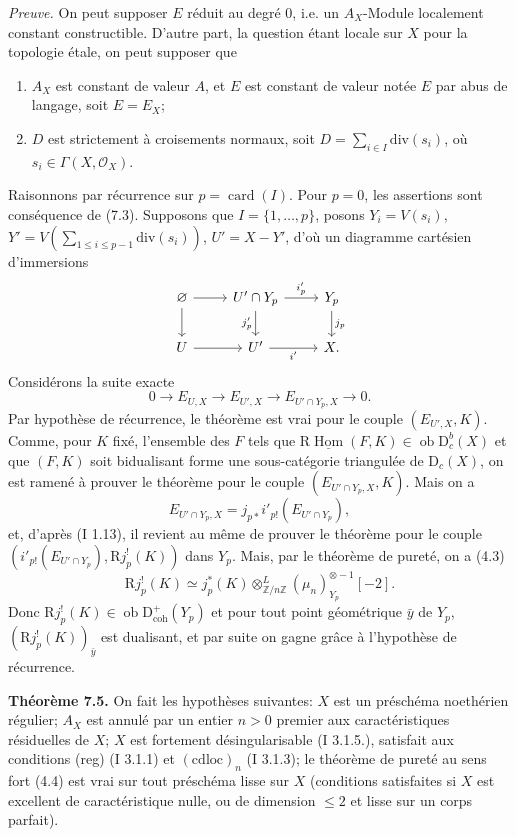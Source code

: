 \documentclass[11pt]{article}
\DeclareMathOperator{\Hom}{Hom}
\newcommand{\R}{\mathrm{R}}\newcommand{\RHomCore}{\mathrm{RHom}}
\newcommand{\D}{\mathrm{D}}
\newcommand{\Z}{\mathbb{Z}}
\newcommand{\ob}{\operatorname{ob}}
\providecommand{\Hom}{\operatorname{Hom}}
\providecommand{\ob}{\operatorname{ob}}
\providecommand{\R}{\mathrm R}
\providecommand{\Z}{\mathbb Z}
\providecommand{\Hom}{\operatorname{Hom}}
\begin{document}
\emph{Preuve.} On peut supposer $E$ réduit au degré $0$, i.e. un $A_X$-Module localement constant constructible. D'autre part, la question étant locale sur $X$ pour la topologie étale, on peut supposer que
\begin{enumerate}[label=(\alph*)]
\item $A_X$ est constant de valeur $A$, et $E$ est constant de valeur notée $E$ par abus de langage, soit $E=E_X$;
\item $D$ est strictement à croisements normaux, soit $D=\sum_{i\in I}\mathrm{div}(s_i)$, où $s_i\in\Gamma(X,\mathcal{O}_X)$.
\end{enumerate}
Raisonnons par récurrence sur $p=\operatorname{card}(I)$. Pour $p=0$, les assertions sont conséquence de (7.3). Supposons que $I=\{1,\ldots,p\}$, posons $Y_i=V(s_i)$, $Y'=V(\sum_{1\leq i\leq p-1}\mathrm{div}(s_i))$, $U'=X-Y'$, d'où un diagramme cartésien d'immersions
\[
\begin{tikzcd}
\varnothing \arrow[r] \arrow[d] & U'\cap Y_p \arrow[r,"i'_p"] \arrow[d,"j'_p"'] & Y_p \arrow[d,"j_p"]\\
U \arrow[r] & U' \arrow[r,"i'"'] & X.
\end{tikzcd}
\]
Considérons la suite exacte
\[
        0\longrightarrow E_{U,X}\longrightarrow E_{U',X}\longrightarrow E_{U'\cap Y_p,X}\longrightarrow0.
\]
Par hypothèse de récurrence, le théorème est vrai pour le couple $(E_{U',X},K)$. Comme, pour $K$ fixé, l'ensemble des $F$ tels que $\R\underline{\Hom}(F,K)\in\ob\D_c^b(X)$ et que $(F,K)$ soit bidualisant forme une sous-catégorie triangulée de $\D_c(X)$, on est ramené à prouver le théorème pour le couple $(E_{U'\cap Y_p,X},K)$. Mais on a
\[
        E_{U'\cap Y_p,X}=j_{p*}i'_{p!}(E_{U'\cap Y_p}),
\]
et, d'après (I 1.13), il revient au même de prouver le théorème pour le couple $(i'_{p!}(E_{U'\cap Y_p}),\R j_p^!(K))$ dans $Y_p$. Mais, par le théorème de pureté, on a (4.3)
\[
        \R j_p^!(K)\simeq j_p^*(K)\otimes^L_{\Z/n\Z}(\mu_n)_{Y_p}^{\otimes -1}[-2].
\]
Donc $\R j_p^!(K)\in\ob\D^{+}_{\mathrm{coh}}(Y_p)$ et pour tout point géométrique $\bar{y}$ de $Y_p$, $(\R j_p^!(K))_{\bar{y}}$ est dualisant, et par suite on gagne grâce à l'hypothèse de récurrence.

\textbf{Théorème 7.5.} On fait les hypothèses suivantes: $X$ est un préschéma noethérien régulier; $A_X$ est annulé par un entier $n>0$ premier aux caractéristiques résiduelles de $X$; $X$ est fortement désingularisable (I 3.1.5.), satisfait aux conditions (reg) (I 3.1.1) et $(\mathrm{cdloc})_n$ (I 3.1.3); le théorème de pureté au sens fort (4.4) est vrai sur tout préschéma lisse sur $X$ (conditions satisfaites si $X$ est excellent de caractéristique nulle, ou de dimension $\leq2$ et lisse sur un corps parfait).
\end{document}
